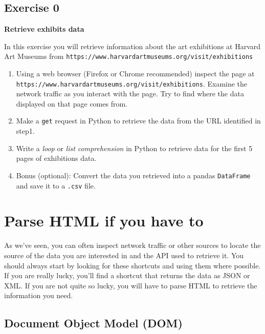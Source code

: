 \documentclass[]{book}
\providecommand{\tightlist}{%
  \setlength{\itemsep}{0pt}\setlength{\parskip}{0pt}}
\begin{document}
\hypertarget{exercise-0-4}{%
\subsection{Exercise 0}\label{exercise-0-4}}

\textbf{Retrieve exhibits data}

In this exercise you will retrieve information about the art
exhibitions at Harvard Art Museums from
\texttt{https://www.harvardartmuseums.org/visit/exhibitions}

\begin{enumerate}
\def\labelenumi{\arabic{enumi}.}
\tightlist
\item
  Using a web browser (Firefox or Chrome recommended) inspect the
  page at \texttt{https://www.harvardartmuseums.org/visit/exhibitions}. Examine
  the network traffic as you interact with the page. Try to find
  where the data displayed on that page comes from.
\item
  Make a \texttt{get} request in Python to retrieve the data from the URL
  identified in step1.
\item
  Write a \emph{loop} or \emph{list comprehension} in Python to retrieve data
  for the first 5 pages of exhibitions data.
\item
  Bonus (optional): Convert the data you retrieved into a pandas
  \texttt{DataFrame} and save it to a \texttt{.csv} file.
\end{enumerate}

\hypertarget{parse-html-if-you-have-to}{%
\section{Parse HTML if you have to}\label{parse-html-if-you-have-to}}

As we've seen, you can often inspect network traffic or other sources
to locate the source of the data you are interested in and the API
used to retrieve it. You should always start by looking for these
shortcuts and using them where possible. If you are really lucky,
you'll find a shortcut that returns the data as JSON or XML. If you
are not quite so lucky, you will have to parse HTML to retrieve the
information you need.

\hypertarget{document-object-model-dom}{%
\subsection{Document Object Model (DOM)}\label{document-object-model-dom}}
\end{document}
